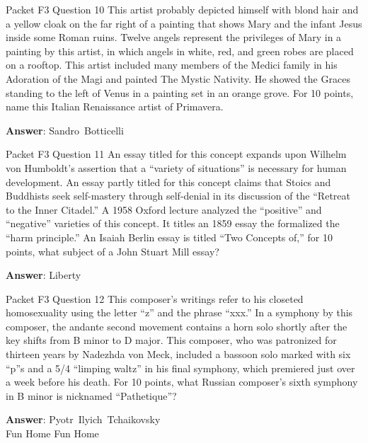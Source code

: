 \begin{frame}{Packet F3 Question 10}
This artist probably depicted himself with blond hair and a yellow cloak on the far right of a painting that shows Mary and the infant Jesus inside some Roman ruins. Twelve angels represent the privileges of Mary in a painting by this artist, in which angels in white, red, and green robes are placed on a rooftop. This artist included many members of the Medici family in his Adoration of the Magi and   painted The Mystic Nativity. He showed     the Graces standing to the left of Venus in a painting set in an orange grove. For   10 points, name this Italian Renaissance artist of Primavera.

\textbf{Answer}: Sandro\ Botticelli\\
\end{frame}

\begin{frame}{Packet F3 Question 11}
An essay titled for this concept expands upon Wilhelm von Humboldt’s assertion that a “variety of situations” is necessary for human development. An essay partly titled for this concept claims that Stoics and Buddhists seek self-mastery through     self-denial in its discussion of the “Retreat to the Inner Citadel.” A 1958 Oxford lecture analyzed the “positive” and “negative” varieties of this concept. It titles an 1859 essay the formalized the “harm principle.”     An Isaiah Berlin essay is titled “Two Concepts of,” for 10 points, what subject of a John Stuart Mill essay?

\textbf{Answer}: Liberty\\
\end{frame}

\begin{frame}{Packet F3 Question 12}
This composer’s writings refer to his closeted homosexuality using   the letter “z” and the phrase “xxx.” In a symphony by this composer, the andante second movement contains a horn solo shortly after the key shifts from B minor to D major. This composer, who was patronized for thirteen years by Nadezhda von Meck, included a bassoon solo marked   with six “p”s and a 5/4 “limping waltz” in his final symphony,   which premiered just over a week before   his death. For 10 points, what Russian composer’s sixth symphony in B minor is nicknamed “Pathetique”?  

\textbf{Answer}: Pyotr\ Ilyich\ Tchaikovsky\\
 Fun Home
 Fun Home
\end{frame}

